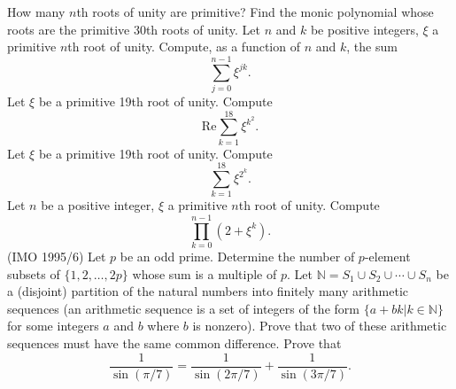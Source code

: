 \documentclass[11pt]{article}
\begin{document}
\vspace{5mm}
\be
\ii How many $n$th roots of unity are primitive?
\ii Find the monic polynomial whose roots are the primitive 30th roots of unity.
\ii Let $n$ and $k$ be positive integers, $\xi$ a primitive $n$th root of unity.  Compute, as a function of $n$ and $k$, the sum \[\sum_{j=0}^{n-1}\xi^{jk}.\]
\ii Let $\xi$ be a primitive 19th root of unity.  Compute \[\textrm{Re} \sum_{k=1}^{18}\xi^{k^2}.\]
\ii Let $\xi$ be a primitive 19th root of unity.  Compute \[\sum_{k=1}^{18}\xi^{2^k}.\]
\ii Let $n$ be a positive integer, $\xi$ a primitive $n$th root of unity.  Compute \[\prod_{k=0}^{n-1}(2+\xi^k).\]
\ii (IMO 1995/6) Let $p$ be an odd prime.  Determine the number of $p$-element subsets of $\{1,2,\ldots,2p\}$ whose sum is a multiple of $p$.
\ii Let $\mathbb N = S_1\cup S_2\cup\cdots\cup S_n$ be a (disjoint) partition of the natural numbers into finitely many arithmetic sequences (an arithmetic sequence is a set of integers of the form $\{a+bk|k\in\mathbb N\}$ for some integers $a$ and $b$ where $b$ is nonzero).  Prove that two of these arithmetic sequences must have the same common difference.
\ii Prove that \[\frac{1}{\sin(\pi/7)} = \frac{1}{\sin(2\pi/7)} + \frac{1}{\sin(3\pi/7)}.\] 
\ee
\end{document}
